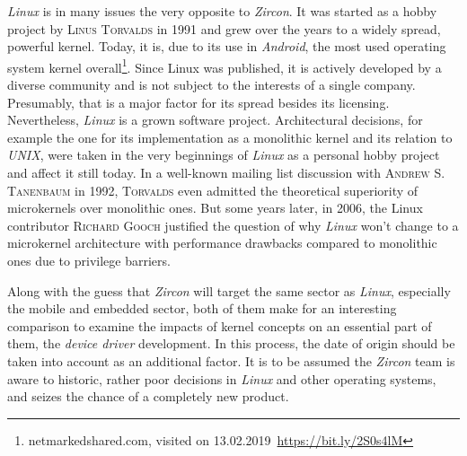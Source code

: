 \textit{Linux} is in many issues the very opposite to \textit{Zircon}.
It was started as a hobby project by \textsc{Linus Torvalds} in 1991 and grew over the years to a widely spread, powerful kernel.
Today, it is, due to its use in \textit{Android}, the most used operating system kernel overall\footnote{netmarkedshared.com, visited on 13.02.2019~\url{https://bit.ly/2S0s4lM}}. 
Since Linux was published, it is actively developed by a diverse community and is not subject to the interests of a single company. 
Presumably, that is a major factor for its spread besides its licensing.
Nevertheless, \textit{Linux} is a grown software project.
Architectural decisions, for example the one for its implementation as a monolithic kernel and its relation to \textit{UNIX}, were taken in the very beginnings of \textit{Linux} as a personal hobby project and affect it still today.
In a well-known mailing list discussion with \textsc{Andrew S. Tanenbaum} in 1992, \textsc{Torvalds} even admitted the theoretical superiority of microkernels over monolithic ones\cite{linux-is-obsolete}.
But some years later, in 2006, the Linux contributor \textsc{Richard Gooch} justified the question of why \textit{Linux} won't change to a microkernel architecture with performance drawbacks compared to monolithic ones due to privilege barriers\cite{why-linux-monolith}.

Along with the guess that \textit{Zircon} will target the same sector as \textit{Linux}, especially the mobile and embedded sector, both of them make for an interesting comparison to examine the impacts of kernel concepts on an essential part of them, the \textit{device driver} development.
In this process, the date of origin should be taken into account as an additional factor.
It is to be assumed the \textit{Zircon} team is aware to historic, rather poor decisions in \textit{Linux} and other operating systems, and seizes the chance of a completely new product.




